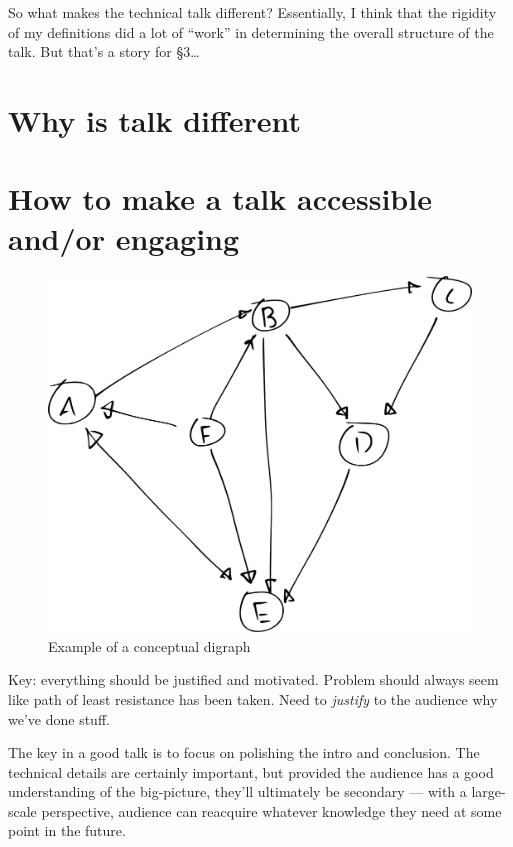 \documentclass{fkpset}
\begin{document}
\begin{solution}[Response.]
  So what makes the technical talk different? Essentially, I think
  that the rigidity of my definitions did a lot of ``work'' in
  determining the overall structure of the talk. But that's a story
  for \S 3\ldots






  \section{Why is talk different}

  \section{How to make a talk accessible and/or engaging}


  \begin{figure}[h]
    \centering
    \includegraphics[width=.5\linewidth,keepaspectratio]{graph.pdf}
    \caption{Example of a conceptual digraph}
  \end{figure}

  Key: everything should be justified and motivated. Problem should
  always seem like path of least resistance has been taken. Need to
  \emph{justify} to the audience why we've done stuff.

  The key in a good talk is to focus on polishing the intro and
  conclusion. The technical details are certainly important, but
  provided the audience has a good understanding of the big-picture,
  they'll ultimately be secondary --- with a large-scale perspective,
  audience can reacquire whatever knowledge they need at some point in
  the future.


\end{solution}
\end{document}
